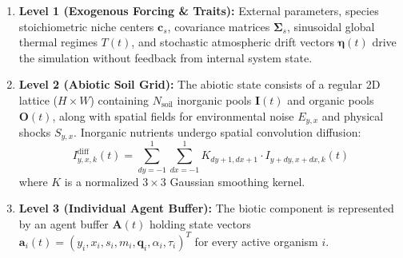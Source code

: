 \documentclass[11pt,a4paper]{article}
\begin{document}
\begin{enumerate}
    \item \textbf{Level 1 (Exogenous Forcing \& Traits):} External parameters, species stoichiometric niche centers $\boldsymbol{c}_s$, covariance matrices $\boldsymbol{\Sigma}_s$, sinusoidal global thermal regimes $T(t)$, and stochastic atmospheric drift vectors $\boldsymbol{\eta}(t)$ drive the simulation without feedback from internal system state.
    
    \item \textbf{Level 2 (Abiotic Soil Grid):} The abiotic state consists of a regular 2D lattice ($H \times W$) containing $N_{\text{soil}}$ inorganic pools $\mathbf{I}(t)$ and organic pools $\mathbf{O}(t)$, along with spatial fields for environmental noise $E_{y,x}$ and physical shocks $S_{y,x}$. Inorganic nutrients undergo spatial convolution diffusion:
    \begin{equation}
    I^{\text{diff}}_{y,x,k}(t) = \sum_{dy=-1}^{1} \sum_{dx=-1}^{1} K_{dy+1, dx+1} \cdot I_{y+dy, x+dx, k}(t)
    \end{equation}
    where $K$ is a normalized $3 \times 3$ Gaussian smoothing kernel.
    
    \item \textbf{Level 3 (Individual Agent Buffer):} The biotic component is represented by an agent buffer $\mathbf{A}(t)$ holding state vectors $\mathbf{a}_i(t) = (y_i, x_i, s_i, m_i, \boldsymbol{q}_i, \alpha_i, \tau_i)^T$ for every active organism $i$.
    

\end{enumerate}
\end{document}
